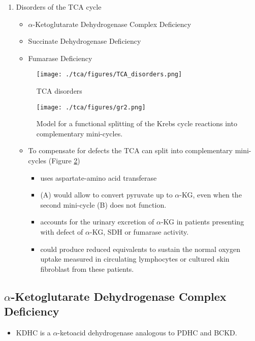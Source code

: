 \documentclass{scrartcl}
\begin{document}
\begin{enumerate}
\item Disorders of the TCA cycle
\label{sec:org58952b5}

\begin{itemize}
\item \(\alpha\)-Ketoglutarate Dehydrogenase Complex Deficiency
\item Succinate Dehydrogenase Deficiency
\item Fumarase Deficiency
\end{itemize}

\begin{figure}[htbp]
\centering
\texttt{[image: ./tca/figures/TCA\_disorders.png]}
\caption{\label{fig:org9372203}
TCA disorders}
\end{figure}


\begin{figure}[htbp]
\centering
\texttt{[image: ./tca/figures/gr2.png]}
\caption{\label{fig:orgaec920d}
Model for a functional splitting of the Krebs cycle reactions into complementary mini-cycles.}
\end{figure}

\begin{itemize}
\item To compensate for defects the TCA can split into complementary
mini-cycles (Figure \ref{fig:orgaec920d})
\begin{itemize}
\item uses aspartate-amino acid transferase
\item (A) would allow to convert pyruvate up to \(\alpha\)-KG, even when the second mini-cycle (B) does not function.
\item accounts for the urinary excretion of \(\alpha\)-KG in patients
presenting with defect of \(\alpha\)-KG, SDH or fumarase activity.
\item could produce reduced equivalents to sustain the normal oxygen
uptake measured in circulating lymphocytes or cultured skin
fibroblast from these patients.
\end{itemize}
\end{itemize}
\end{enumerate}

\subsection{\(\alpha\)-Ketoglutarate Dehydrogenase Complex Deficiency}
\label{sec:orga09d5d4}
\begin{itemize}
\item KDHC is a \(\alpha\)-ketoacid dehydrogenase analogous to PDHC and BCKD.
\end{itemize}
\end{document}
